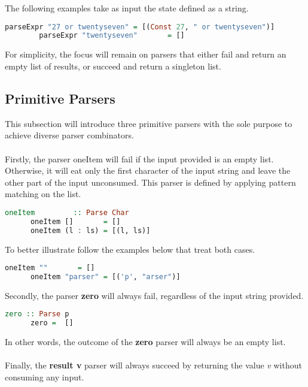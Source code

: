 \documentclass[a4paper, onecolumn]{article}
\begin{document}
    The following examples take as input the state defined as a string. 
    
    \begin{lstlisting}[language=Haskell]
        parseExpr "27 or twentyseven" = [(Const 27, " or twentyseven")] 
        parseExpr "twentyseven"       = []
    \end{lstlisting}
    
    For simplicity, the focus will remain on parsers that either fail and return an empty list of results, or succeed and return a singleton list.
    
    \subsection{Primitive Parsers}
    
    This subsection will introduce three primitive parsers with the sole purpose to achieve diverse parser combinators. \\ \\
    Firstly, the parser oneItem will fail if the input provided is an empty list. Otherwise, it will eat only the first character of the input string and leave the other part of the input unconsumed. This parser is defined by applying pattern matching on the list. 
     
    
    \begin{lstlisting}[language=Haskell]
      oneItem         :: Parse Char
      oneItem []       = []
      oneItem (l : ls) = [(l, ls)]
    \end{lstlisting}
    
    To better illustrate follow the examples below that treat both cases.
    
    \begin{lstlisting}[language=Haskell]
      oneItem ""       = []
      oneItem "parser" = [('p', "arser")]
    \end{lstlisting}
    Secondly, the parser \textbf{zero} will always fail, regardless of the input string provided. 
    
    \begin{lstlisting}[language=Haskell]
      zero :: Parse p
      zero =  [] 
    \end{lstlisting}
    
    In other words, the outcome of the \textbf{zero} parser will always be an empty list. \\ \\
    Finally, the \textbf{result v} parser will always succeed by returning the value \textit{v} without consuming any input.
    
\end{document}
